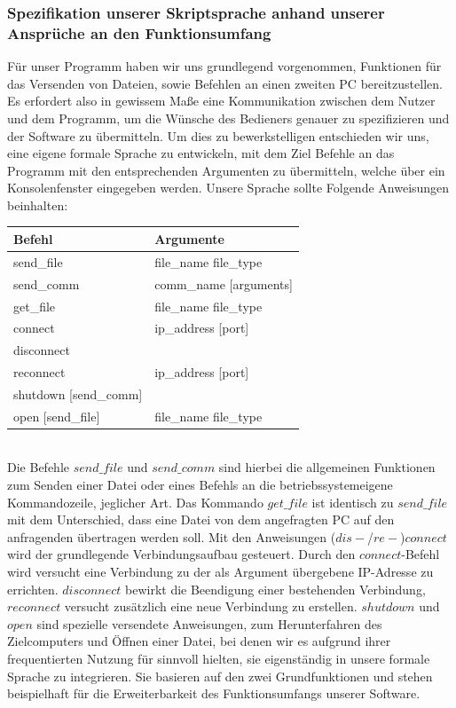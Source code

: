 \subsubsection{Spezifikation unserer Skriptsprache anhand unserer Ansprüche an den Funktionsumfang}
Für unser Programm haben wir uns grundlegend vorgenommen, Funktionen für das Versenden von Dateien, sowie Befehlen an einen zweiten PC bereitzustellen. 
Es erfordert also in gewissem Maße eine Kommunikation zwischen dem Nutzer und dem Programm, um die Wünsche des Bedieners genauer zu spezifizieren und der Software zu übermitteln. 
Um dies zu bewerkstelligen entschieden wir uns, eine eigene formale Sprache zu entwickeln, mit dem Ziel Befehle an das Programm mit den entsprechenden Argumenten zu übermitteln, welche über ein Konsolenfenster eingegeben werden.
Unsere Sprache sollte Folgende Anweisungen beinhalten:\\
\begin{table}[h!]
\centering
\begin{tabular}{|ll|}
\hline
Befehl & Argumente \\ \hline
send\_file & file\_name file\_type \\
send\_comm & comm\_name {[}arguments{]} \\
get\_file & file\_name file\_type \\
connect & ip\_address [port]\\
disconnect & \\
reconnect & ip\_address [port]\\
shutdown [send\_comm] & \\
open [send\_file] & file\_name file\_type \\ \hline
\end{tabular}
\end{table}\\
Die Befehle $send\_file$ und $send\_comm$ sind hierbei die allgemeinen Funktionen zum Senden einer Datei oder eines Befehls an die betriebssystemeigene Kommandozeile, jeglicher Art. Das Kommando $get\_file$ ist identisch zu $send\_file$ mit dem Unterschied, dass eine Datei von dem angefragten PC auf den anfragenden übertragen werden soll. Mit den Anweisungen ($dis-$/$re-$)$connect$ wird der grundlegende Verbindungsaufbau gesteuert. Durch den $connect$-Befehl wird versucht eine Verbindung zu der als Argument übergebene IP-Adresse zu errichten. $disconnect$ bewirkt die Beendigung einer bestehenden Verbindung, $reconnect$ versucht zusätzlich eine neue Verbindung zu erstellen. 
$shutdown$ und $open$ sind spezielle versendete Anweisungen, zum Herunterfahren des Zielcomputers und Öffnen einer Datei, bei denen wir es aufgrund ihrer frequentierten Nutzung für sinnvoll hielten, sie eigenständig in unsere formale Sprache zu integrieren. Sie basieren auf den zwei Grundfunktionen und stehen beispielhaft für die Erweiterbarkeit des Funktionsumfangs unserer Software. 

